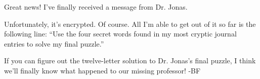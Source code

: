Great news! I've finally received a message from Dr. Jonas.

Unfortunately, it's encrypted. Of course. All I'm able to get
out of it so far is the following line: ``Use the four secret words
found in my most cryptic journal entries to solve my final
puzzle.''

If you can figure out the twelve-letter solution to Dr. Jonas's final
puzzle, I think we'll finally know what happened to our missing
professor! -BF
